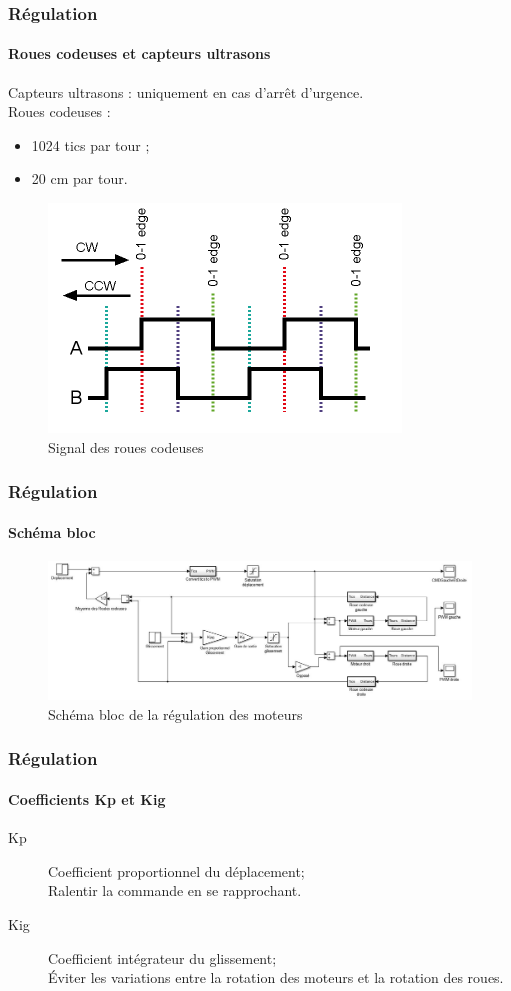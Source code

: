 \begin{frame}
\frametitle{Régulation}
\framesubtitle{Roues codeuses et capteurs ultrasons}
Capteurs ultrasons : uniquement en cas d'arrêt d'urgence.\\
Roues codeuses :
\begin{itemize}
	\item 1024 tics par tour ;
	\item 20 cm par tour.
\end{itemize}
\begin{figure}[!ht]
	\centering
	\includegraphics[scale=0.5]{roues_codeuses.png}
	\caption{Signal des roues codeuses}
\end{figure}
\end{frame}

\begin{frame}
\frametitle{Régulation}
\framesubtitle{Schéma bloc}
\begin{figure}[!ht]
	\centering
	\includegraphics[scale=0.28]{simulink.jpg}
	\caption{Schéma bloc de la régulation des moteurs}
	\label{img:simulink}
\end{figure}
\end{frame}

\begin{frame}
\frametitle{Régulation}
\framesubtitle{Coefficients Kp et Kig}
\begin{description}
	\item[Kp] Coefficient proportionnel du déplacement; 
			\hfill \\ Ralentir la commande en se rapprochant. 
	\item[Kig] Coefficient intégrateur du glissement;
			\hfill \\ Éviter les variations entre la rotation des moteurs et la rotation des roues.
\end{description}
\end{frame}